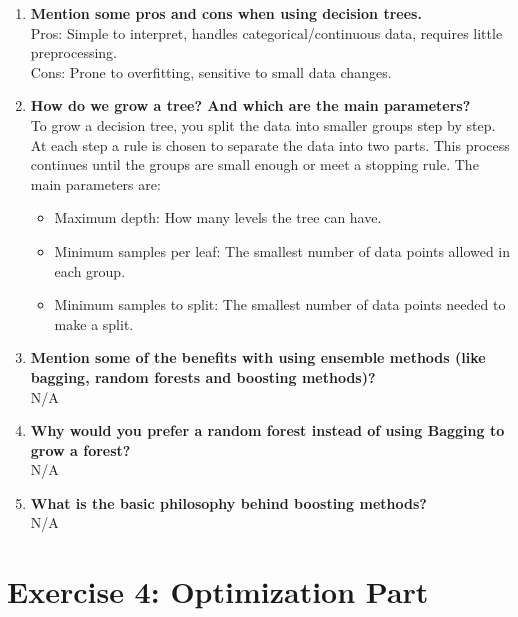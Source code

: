 \documentclass[a4paper,12pt]{article}
\begin{document}
	\begin{enumerate}
		\item \textbf{Mention some pros and cons when using decision trees.} \\
		Pros: Simple to interpret, handles categorical/continuous data, requires little preprocessing. \\
		Cons: Prone to overfitting, sensitive to small data changes.
		
		\item \textbf{How do we grow a tree? And which are the main parameters?} \\
		To grow a decision tree, you split the data into smaller groups step by step. At each step a rule is chosen to separate the data into two parts. This process continues until the groups are small enough or meet a stopping rule. The main parameters are:
		\begin{itemize}
			\item Maximum depth: How many levels the tree can have.
			\item Minimum samples per leaf: The smallest number of data points allowed in each group.
			\item Minimum samples to split: The smallest number of data points needed to make a split.
		\end{itemize}

		
		\item \textbf{Mention some of the benefits with using ensemble methods (like bagging, random forests and boosting methods)?} \\
		N/A
		
		\item \textbf{Why would you prefer a random forest instead of using Bagging to grow a forest?} \\
		N/A
		
		\item \textbf{What is the basic philosophy behind boosting methods?} \\
		N/A
	\end{enumerate}
	
	\section*{Exercise 4: Optimization Part}
	
\end{document}
